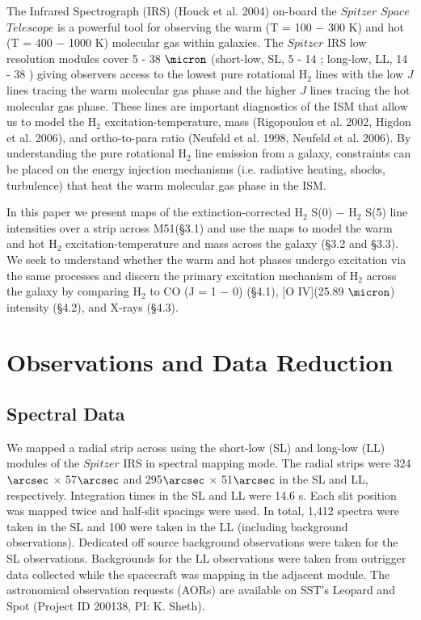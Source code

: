 \documentclass[manuscript]{aastex}
\begin{document}
The Infrared Spectrograph (IRS) (Houck et al. 2004) on-board the $Spitzer$ $Space$ $Telescope$ is a powerful tool for observing the warm (T = 100 $-$ 300 K) and hot (T = 400 $-$ 1000 K) molecular gas within galaxies.  The $Spitzer$ IRS low resolution modules cover 5 - 38 $\micron$ (short-low, SL, 5 - 14 \micron; long-low, LL, 14 - 38 \micron) giving observers access to the lowest pure rotational $\mathrm{H_2}$ lines with the low $J$ lines tracing the warm molecular gas phase and the higher $J$ lines tracing the hot molecular gas phase.  These lines are important diagnostics of the ISM that allow us to  model the $\mathrm{H_2}$ excitation-temperature, mass (Rigopoulou et al. 2002, Higdon et al. 2006), and ortho-to-para ratio (Neufeld et al. 1998, Neufeld et al. 2006).  By understanding the pure rotational $\mathrm{H_2}$ line emission from a galaxy, constraints can be placed on the energy injection mechanisms (i.e. radiative heating, shocks, turbulence) that heat the warm molecular gas phase in the ISM.  

In this paper we present maps of the extinction-corrected $\mathrm{H_2}$ S(0) $-$ $\mathrm{H_2}$ S(5) line intensities over a strip across M51(\S3.1) and use the maps to model the warm and hot $\mathrm{H_2}$ excitation-temperature and mass across the galaxy (\S3.2 and \S3.3).  We seek to understand  whether the warm and hot phases undergo excitation via the same processes and discern the primary excitation mechanism of $\mathrm{H_2}$ across the galaxy by comparing $\mathrm{H_2}$ to CO (J = 1 $-$ 0) (\S4.1), [O IV](25.89 $\micron$) intensity (\S4.2), and X-rays (\S4.3).

\section{Observations and Data Reduction}

\subsection{Spectral Data}

We mapped a radial strip across  using the short-low (SL) and long-low (LL) modules of the $Spitzer$ IRS in spectral mapping mode.  The radial strips were 324$\arcsec$ $\times$ 57$\arcsec$ and 295$\arcsec$ $\times$ 51$\arcsec$ in the SL and LL, respectively.  Integration times in the SL and LL were 14.6 s.  Each slit position was mapped twice and half-slit spacings were used.  In total, 1,412 spectra were taken in the SL and 100 were taken in the LL (including background observations).  Dedicated off source background observations were taken for the SL observations.  Backgrounds for the LL observations were taken from outrigger data collected while the spacecraft was mapping in the adjacent module.  The astronomical observation requests (AORs) are available on SST's Leopard and Spot (Project ID 200138, PI: K. Sheth).
\end{document}
